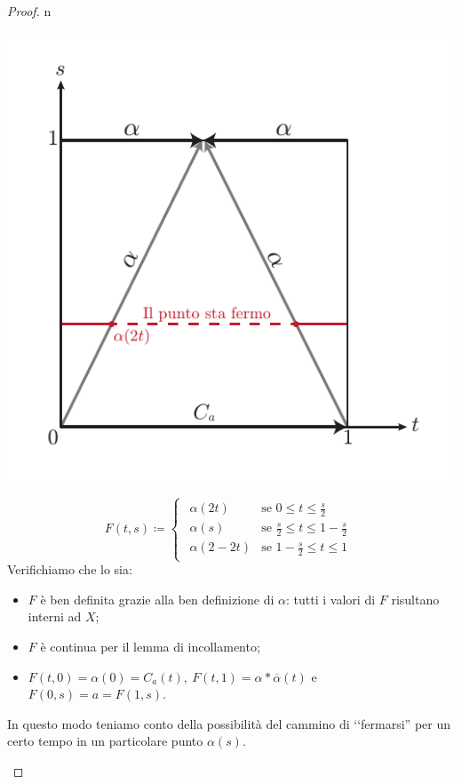 \begin{proof}{n}
\begin{enumerate}[label=\Roman*]
\begin{minipage}{.37\linewidth}
	\includegraphics[trim=0cm 0cm 0cm 0cm,clip,scale=0.6]{images/camminoinverso.pdf}
\end{minipage}
\begin{equation*}
	F\left(t,s\right)\coloneqq\begin{cases}
		\begin{array}{ll}
			\alpha\left(2t\right)&\text{se }0\leq t\leq \frac{s}{2}\\
			\alpha\left(s\right)&\text{se }\frac{s}{2}\leq t\leq 1-\frac{s}{2}\\
			\alpha\left(2-2t\right)&\text{se }1-\frac{s}{2}\leq t\leq 1
		\end{array}
	\end{cases}
\end{equation*}
Verifichiamo che lo sia:
\begin{itemize}
\item $F$ è ben definita grazie alla ben definizione di $\alpha$: tutti i valori di $F$ risultano interni ad $X$;
\item $F$ è continua per il lemma di incollamento;
\item $F\left(t,0\right)=\alpha\left(0\right)=C_a\left(t\right),\ F\left(t,1\right)=\alpha\ast\overline{\alpha}\left(t\right)$ e $F\left(0,s\right)=a=F\left(1,s\right)$.
\end{itemize}
In questo modo teniamo conto della possibilità del cammino di ‘‘fermarsi'' per un certo tempo in un particolare punto $\alpha\left(s\right)$.
\end{enumerate}
\end{proof}
